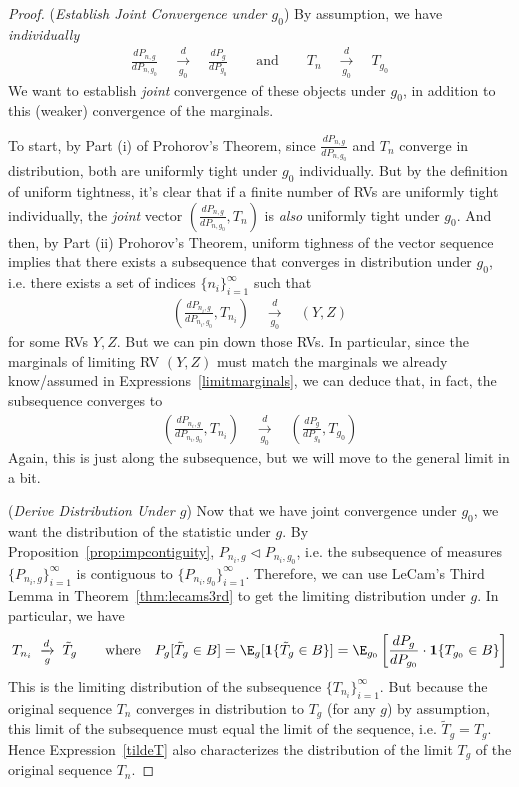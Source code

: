 \documentclass[12pt]{article}
\theoremstyle{plain}
\theoremstyle{definition}
\theoremstyle{remark}
\newcommand{\dto}{\xrightarrow{d}}
\begin{document}
\begin{proof}
(\emph{Establish Joint Convergence under $g_0$})
By assumption, we have \emph{individually}
\begin{align}
  \frac{dP_{n,g}}{dP_{n,g_0}}
  \quad\underset{g_0}{\dto}\quad
  \frac{dP_{g}}{dP_{g_0}}
  \qquad\text{and}\qquad
  T_n
  \quad\underset{g_0}{\dto}\quad
  T_{g_0}
  \label{limitmarginals}
\end{align}
We want to establish \emph{joint} convergence of these objects under
$g_0$, in addition to this (weaker) convergence of the marginals.

To start, by Part (i) of Prohorov's Theorem, since
$\frac{dP_{n,g}}{dP_{n,g_0}}$ and $T_n$ converge in distribution, both
are uniformly tight under $g_0$ individually.
But by the definition of uniform tightness, it's clear that if a finite
number of RVs are uniformly tight individually, the \emph{joint} vector
$(\frac{dP_{n,g}}{dP_{n,g_0}},T_n)$ is \emph{also} uniformly tight under
$g_0$.
And then, by Part (ii) Prohorov's Theorem, uniform tighness of the
vector sequence implies that there exists a subsequence that converges
in distribution under $g_0$, i.e. there exists a set of indices
$\{n_i\}_{i=1}^\infty$ such that
\begin{align*}
  \left(\frac{dP_{n_i,g}}{dP_{n_i,g_0}},T_{n_i}\right)
  \quad\underset{g_0}{\dto}\quad
  \left(Y,Z\right)
\end{align*}
for some RVs $Y,Z$. But we can pin down those RVs. In particular, since
the marginals of limiting RV $(Y,Z)$ must match the marginals we already
know/assumed in Expressions~\ref{limitmarginals}, we can deduce that, in
fact, the subsequence converges to
\begin{align}
  \left(\frac{dP_{n_i,g}}{dP_{n_i,g_0}},T_{n_i}\right)
  \quad\underset{g_0}{\dto}\quad
  \left(\frac{dP_g}{dP_{g_0}},T_{g_0}\right)
  \label{lecams3rdstep}
\end{align}
Again, this is just along the subsequence, but we will move to the
general limit in a bit.

(\emph{Derive Distribution Under $g$})
Now that we have joint convergence under $g_0$, we want the distribution
of the statistic under $g$.
By Proposition~\ref{prop:impcontiguity},
$P_{n_i,g}\vartriangleleft P_{n_i,g_0}$, i.e. the subsequence of
measures $\{P_{n_i,g}\}_{i=1}^\infty$ is contiguous to
$\{P_{n_i,g_0}\}_{i=1}^\infty$.
Therefore, we can use LeCam's Third Lemma in Theorem~\ref{thm:lecams3rd}
to get the limiting distribution under $g$.
In particular, we have
\begin{align}
  T_{n_i}\;\underset{g}{\dto}\;\tilde{T}_g
  \qquad \text{where}\quad
  P_{g}[\tilde{T}_g\in B]
  = \E_{g}[\mathbf{1}\{\tilde{T}_g\in B\}]
  =\E_{g_0}\left[\frac{dP_g}{dP_{g_0}}\cdot \mathbf{1}\{T_{g_0}\in B\}\right]
  \label{tildeT}
\end{align}
This is the limiting distribution of the subsequence
$\{T_{n_i}\}_{i=1}^\infty$. But because the original sequence $T_n$
converges in distribution to $T_g$ (for any $g$) by assumption, this
limit of the subsequence must equal the limit of the sequence, i.e.
$\tilde{T}_g=T_g$. Hence Expression~\ref{tildeT} also characterizes the
distribution of the limit $T_g$ of the original sequence $T_n$.


\end{proof}
\end{document}
